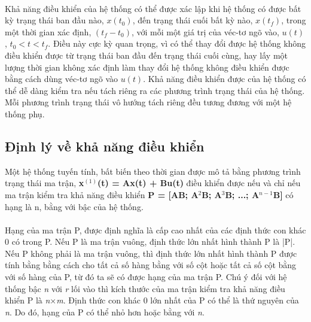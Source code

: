 \paragraph{}Khả năng điều khiển của hệ thống có thể được xác lập khi hệ thống có được bất kỳ trạng thái ban đầu nào, $x(t_{0})$, đến trạng thái cuối bất kỳ nào, $x(t_{f})$, trong một thời gian xác định, $(t_{f} - t_{0})$, với mỗi một giá trị của véc-tơ ngõ vào, $u(t)$, $t_{0} < t < t_{f}$. Điều này cực kỳ quan trọng, vì có thể thay đổi được hệ thống không điều khiển được từ trạng thái ban đầu đến trạng thái cuối cùng, hay lấy một lượng thời gian không xác định làm thay đổi hệ thống không điều khiển được bằng cách dùng véc-tơ ngõ vào $u(t)$. Khả năng điều khiển được của hệ thống có thể dễ dàng kiểm tra nếu tách riêng ra các phương trình trạng thái của hệ thống. Mỗi phương trình trạng thái vô hướng tách riêng đều tương đương với một hệ thống phụ. 
\subsection{Định lý về khả năng điều khiển}
\begin{dl}Một hệ thống tuyến tính, bất biến theo thời gian được mô tả bằng phương trình trạng thái ma trận, \textbf{x$^{(1)}$(t) = Ax(t) + Bu(t)} điều khiển được nếu và chỉ nếu ma trận kiểm tra khả năng điều khiển \textbf{P = [AB; A$^{2}$B; A$^{3}$B; ...; A$^{n-1}$B]} có hạng là n, bằng với bậc của hệ thống. 
\end{dl}
\paragraph{}Hạng của ma trận P, được định nghĩa là cấp cao nhất của các định thức con khác 0 có trong P. Nếu P là ma trận vuông, định thức lớn nhất hình thành P là |P|. Nếu P không phải là ma trận vuông, thì định thức lớn nhất hình thành P được tính bằng bằng cách cho tất cả số hàng bằng với số cột hoặc tất cả số cột bằng với số hàng của P, từ đó ta sẽ có được hạng của ma trận P. Chú ý đối với hệ thống bậc \textit{n} với \textit{r} lối vào thì kích thước của ma trận kiểm tra khả năng điều khiển P là \textit{n}$\times$\textit{m}. Định thức con khác 0 lớn nhất của P có thể là thứ nguyên của \textit{n}. Do đó, hạng của P có thể nhỏ hơn hoặc bằng với \textit{n}. 
